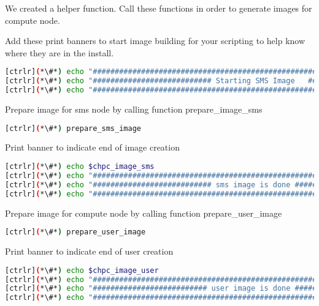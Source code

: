 	We created a helper function. Call these functions in order to generate images for compute node.


	Add these print banners to start image building for your scripting to help know where they are in the install.

\begin{lstlisting}[language=bash,keywords={},upquote=true]
[ctrlr](*\#*) echo "########################################################################"
[ctrlr](*\#*) echo "########################### Starting SMS Image   ###########################"
[ctrlr](*\#*) echo "########################################################################"
\end{lstlisting}

	Prepare image for sms node by calling function prepare\_image\_sms

\begin{lstlisting}[language=bash,keywords={},upquote=true]
[ctrlr](*\#*) prepare_sms_image
\end{lstlisting}


	Print banner to indicate end of image creation

\begin{lstlisting}[language=bash,keywords={},upquote=true]
[ctrlr](*\#*) echo $chpc_image_sms
[ctrlr](*\#*) echo "########################################################################"
[ctrlr](*\#*) echo "########################### sms image is done ##########################"
[ctrlr](*\#*) echo "########################################################################"
\end{lstlisting}
	Prepare image for compute node by calling function prepare\_user\_image

\begin{lstlisting}[language=bash,keywords={},upquote=true]
[ctrlr](*\#*) prepare_user_image
\end{lstlisting}

	Print banner to indicate end of user creation
	
\begin{lstlisting}[language=bash,keywords={},upquote=true]
[ctrlr](*\#*) echo $chpc_image_user
[ctrlr](*\#*) echo "########################################################################"
[ctrlr](*\#*) echo "########################## user image is done ##########################"
[ctrlr](*\#*) echo "########################################################################"
\end{lstlisting}

